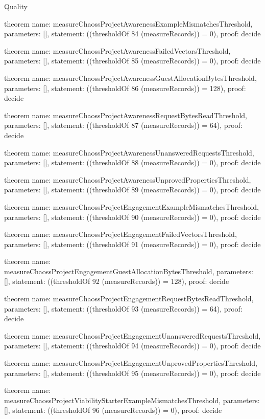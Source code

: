 \begin{lexlean}{Quality}
\begin{semanticmodule}
theorem{
  name: measureChaossProjectAwarenessExampleMismatchesThreshold,
  parameters: [],
  statement: ((thresholdOf 84 (measureRecords)) = 0),
  proof: decide{}
}

theorem{
  name: measureChaossProjectAwarenessFailedVectorsThreshold,
  parameters: [],
  statement: ((thresholdOf 85 (measureRecords)) = 0),
  proof: decide{}
}

theorem{
  name: measureChaossProjectAwarenessGuestAllocationBytesThreshold,
  parameters: [],
  statement: ((thresholdOf 86 (measureRecords)) = 128),
  proof: decide{}
}

theorem{
  name: measureChaossProjectAwarenessRequestBytesReadThreshold,
  parameters: [],
  statement: ((thresholdOf 87 (measureRecords)) = 64),
  proof: decide{}
}

theorem{
  name: measureChaossProjectAwarenessUnansweredRequestsThreshold,
  parameters: [],
  statement: ((thresholdOf 88 (measureRecords)) = 0),
  proof: decide{}
}

theorem{
  name: measureChaossProjectAwarenessUnprovedPropertiesThreshold,
  parameters: [],
  statement: ((thresholdOf 89 (measureRecords)) = 0),
  proof: decide{}
}

theorem{
  name: measureChaossProjectEngagementExampleMismatchesThreshold,
  parameters: [],
  statement: ((thresholdOf 90 (measureRecords)) = 0),
  proof: decide{}
}

theorem{
  name: measureChaossProjectEngagementFailedVectorsThreshold,
  parameters: [],
  statement: ((thresholdOf 91 (measureRecords)) = 0),
  proof: decide{}
}

theorem{
  name: measureChaossProjectEngagementGuestAllocationBytesThreshold,
  parameters: [],
  statement: ((thresholdOf 92 (measureRecords)) = 128),
  proof: decide{}
}

theorem{
  name: measureChaossProjectEngagementRequestBytesReadThreshold,
  parameters: [],
  statement: ((thresholdOf 93 (measureRecords)) = 64),
  proof: decide{}
}

theorem{
  name: measureChaossProjectEngagementUnansweredRequestsThreshold,
  parameters: [],
  statement: ((thresholdOf 94 (measureRecords)) = 0),
  proof: decide{}
}

theorem{
  name: measureChaossProjectEngagementUnprovedPropertiesThreshold,
  parameters: [],
  statement: ((thresholdOf 95 (measureRecords)) = 0),
  proof: decide{}
}

theorem{
  name: measureChaossProjectViabilityStarterExampleMismatchesThreshold,
  parameters: [],
  statement: ((thresholdOf 96 (measureRecords)) = 0),
  proof: decide{}
}


\end{semanticmodule}
\end{lexlean}
